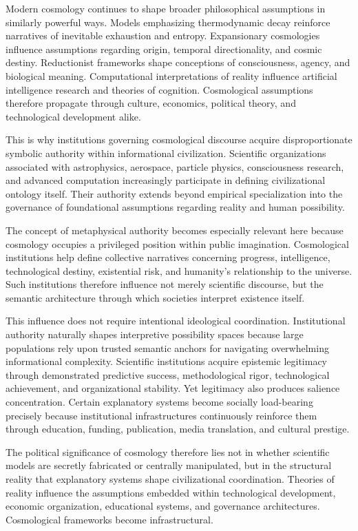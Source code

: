 \documentclass[11pt,a4paper]{article}
\begin{document}
Modern cosmology continues to shape broader philosophical assumptions in similarly powerful ways. Models emphasizing thermodynamic decay reinforce narratives of inevitable exhaustion and entropy. Expansionary cosmologies influence assumptions regarding origin, temporal directionality, and cosmic destiny. Reductionist frameworks shape conceptions of consciousness, agency, and biological meaning. Computational interpretations of reality influence artificial intelligence research and theories of cognition. Cosmological assumptions therefore propagate through culture, economics, political theory, and technological development alike.

This is why institutions governing cosmological discourse acquire disproportionate symbolic authority within informational civilization. Scientific organizations associated with astrophysics, aerospace, particle physics, consciousness research, and advanced computation increasingly participate in defining civilizational ontology itself. Their authority extends beyond empirical specialization into the governance of foundational assumptions regarding reality and human possibility.

The concept of metaphysical authority becomes especially relevant here because cosmology occupies a privileged position within public imagination. Cosmological institutions help define collective narratives concerning progress, intelligence, technological destiny, existential risk, and humanity's relationship to the universe. Such institutions therefore influence not merely scientific discourse, but the semantic architecture through which societies interpret existence itself.

This influence does not require intentional ideological coordination. Institutional authority naturally shapes interpretive possibility spaces because large populations rely upon trusted semantic anchors for navigating overwhelming informational complexity. Scientific institutions acquire epistemic legitimacy through demonstrated predictive success, methodological rigor, technological achievement, and organizational stability. Yet legitimacy also produces salience concentration. Certain explanatory systems become socially load-bearing precisely because institutional infrastructures continuously reinforce them through education, funding, publication, media translation, and cultural prestige.

The political significance of cosmology therefore lies not in whether scientific models are secretly fabricated or centrally manipulated, but in the structural reality that explanatory systems shape civilizational coordination. Theories of reality influence the assumptions embedded within technological development, economic organization, educational systems, and governance architectures. Cosmological frameworks become infrastructural.
\end{document}
